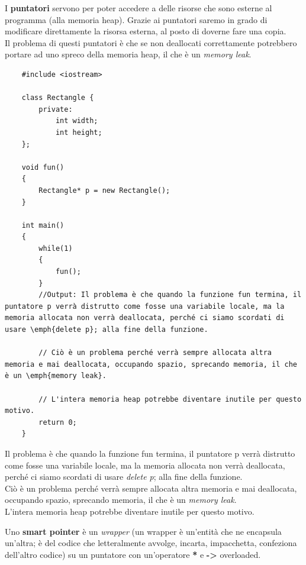 \textsf{\small I \textbf{puntatori} servono per poter accedere a delle risorse che sono esterne al programma (alla memoria heap). Grazie ai puntatori saremo in grado di modificare direttamente la risorsa esterna, al posto di doverne fare una copia.} \\

\textsf{\small Il problema di questi puntatori è che se non deallocati correttamente potrebbero portare ad uno spreco della memoria heap, il che è un \emph{memory leak}.} \\

\begin{lstlisting}
	#include <iostream>
	
	class Rectangle {
		private:
			int width;
			int height;
	};

	void fun()
	{
		Rectangle* p = new Rectangle();
	}

	int main()
	{
		while(1)
		{
			fun();
		}
		//Output: Il problema è che quando la funzione fun termina, il puntatore p verrà distrutto come fosse una variabile locale, ma la memoria allocata non verrà deallocata, perché ci siamo scordati di usare \emph{delete p}; alla fine della funzione.
		
		// Ciò è un problema perché verrà sempre allocata altra memoria e mai deallocata, occupando spazio, sprecando memoria, il che è un \emph{memory leak}.
		
		// L'intera memoria heap potrebbe diventare inutile per questo motivo. 
		return 0;
	}
\end{lstlisting}

\textsf{\small Il problema è che quando la funzione fun termina, il puntatore p verrà distrutto come fosse una variabile locale, ma la memoria allocata non verrà deallocata, perché ci siamo scordati di usare \emph{delete p}; alla fine della funzione.} \\

\textsf{\small Ciò è un problema perché verrà sempre allocata altra memoria e mai deallocata, occupando spazio, sprecando memoria, il che è un \emph{memory leak}.} \\

\textsf{\small L'intera memoria heap potrebbe diventare inutile per questo motivo. } \break

\textsf{\small Uno \textbf{smart pointer} è un \emph{wrapper} (un wrapper è un'entità che ne encapsula un'altra; è del codice che letteralmente avvolge, incarta, impacchetta, confeziona dell'altro codice) su un puntatore con un'operatore \textbf{*} e \textbf{->} overloaded.} \\

